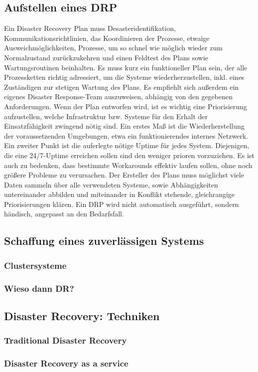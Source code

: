 \documentclass[letterpaper, 12pt]{article}
\let\tempsubsection\subsection
\renewcommand\subsection[1]{\vspace{0cm}\tempsubsection{#1}\vspace{0cm}}
\let\tempsubsubsection\subsubsection
\renewcommand\subsubsection[1]{\vspace{0cm}\tempsubsubsection{#1}\vspace{0cm}}
\begin{document}
\subsection{Aufstellen eines DRP \cite{booktwo}}

Ein Disaster Recovery Plan muss Desasteridentifikation, Kommunikationsrichtlinien, 
das Koordinieren der Prozesse, etwaige Ausweichmöglichkeiten, Prozesse, um so schnel wie möglich wieder 
zum Normalzustand zurückzukehren und einen Feldtest des Plans sowie Wartungsroutinen beinhalten. 
Es muss kurz ein funktioneller Plan sein, der alle Prozessketten richtig adressiert, um die 
Systeme wiederherzustellen, inkl. eines Zuständigen zur stetigen Wartung des Plans.
Es empfiehlt sich außerdem ein eigenes Disaster Response-Team auszuweisen, abhängig von den
gegebenen Anforderungen. Wenn der Plan entworfen wird, ist es wichtig eine Priorisierung aufzustellen,
welche Infrastruktur bzw. Systeme für den Erhalt der Einsatzfähigkeit zwingend nötig sind. Ein erstes Maß
ist die Wiederherstellung der voraussetzenden Umgebungen, etwa ein funktionierendes internes Netzwerk. Ein 
zweiter Punkt ist die auferlegte nötige Uptime für jedes System. Diejenigen, die eine 24/7-Uptime erreichen sollen
sind den weniger prioren vorzuziehen.
Es ist auch zu bedenken, dass bestimmte Workarounds effektiv laufen sollen, ohne noch größere Probleme
zu verursachen. Der Ersteller des Plans muss möglichst viele Daten sammeln über alle verwendeten Systeme,
sowie Abhängigkeiten untereinander abbilden und miteinander in Konflikt stehende, gleichrangige Priorisierungen klären. Ein DRP wird nicht automatisch ausgeführt, sondern händisch, angepasst an den Bedarfsfall.  \\

\subsection{Schaffung eines zuverlässigen Systems \cite{bookthree}}

\subsubsection{Clustersysteme}



\subsubsection{Wieso dann DR?}

\subsection{Disaster Recovery: Techniken}

\subsubsection{Traditional Disaster Recovery}

\subsubsection{Disaster Recovery as a service}

\clearpage



\listoffigures
\end{document}
